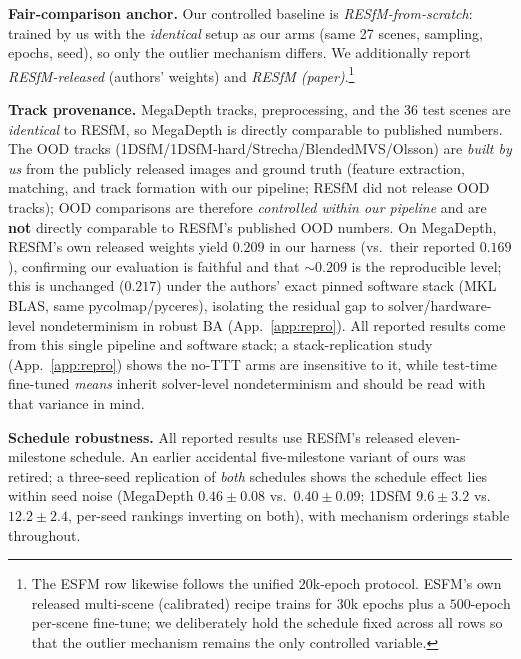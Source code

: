 \documentclass{article}
\begin{document}
\noindent\textbf{Fair-comparison anchor.} Our controlled baseline is
\emph{RESfM-from-scratch}: trained by us with the \emph{identical} setup as our arms (same
27 scenes, sampling, epochs, seed), so only the outlier mechanism differs. We additionally
report \emph{RESfM-released} (authors' weights) and \emph{RESfM (paper)}.\footnote{The
ESFM row likewise follows the unified $20$k-epoch protocol. ESFM's own released
multi-scene (calibrated) recipe trains for $30$k epochs plus a $500$-epoch per-scene
fine-tune; we deliberately hold the schedule fixed across all rows so that the outlier
mechanism remains the only controlled variable.}

\noindent\textbf{Track provenance.} MegaDepth tracks, preprocessing, and the 36 test scenes
are \emph{identical} to RESfM, so MegaDepth is directly comparable to published numbers. The
OOD tracks (1DSfM/1DSfM-hard/Strecha/BlendedMVS/Olsson) are \emph{built by us} from the
publicly released images and ground truth (feature extraction, matching, and track
formation with our pipeline; RESfM did not release OOD tracks); OOD comparisons are therefore \emph{controlled within our pipeline} and are
\textbf{not} directly comparable to RESfM's published OOD numbers. On MegaDepth, RESfM's
own released weights yield $0.209$ in our harness (vs.\ their reported $0.169$),
confirming our evaluation is faithful and that $\sim\!0.209$ is the reproducible level;
this is unchanged ($0.217$) under the authors' exact pinned software stack (MKL BLAS,
same pycolmap/pyceres), isolating the residual gap to solver/hardware-level
nondeterminism in robust BA (App.~\ref{app:repro}). All reported results come from this
single pipeline and software stack; a stack-replication study (App.~\ref{app:repro}) shows the
no-TTT arms are insensitive to it, while test-time fine-tuned \emph{means} inherit
solver-level nondeterminism and should be read with that variance in mind.

\noindent\textbf{Schedule robustness.} All reported results use RESfM's released
eleven-milestone schedule. An earlier accidental five-milestone variant of ours was
retired; a three-seed replication of \emph{both} schedules shows the schedule effect lies
within seed noise (MegaDepth $0.46\pm0.08$ vs.\ $0.40\pm0.09$; 1DSfM $9.6\pm3.2$ vs.\
$12.2\pm2.4$, per-seed rankings inverting on both), with mechanism orderings stable
throughout.
\end{document}
